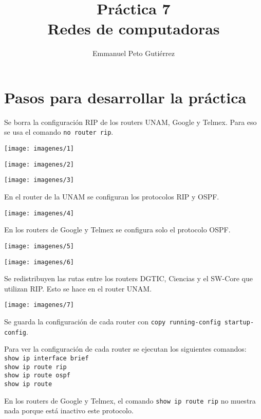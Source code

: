 \documentclass{article}
\title{Práctica 7\\Redes de computadoras}
\author{Emmanuel Peto Gutiérrez}
\begin{document}
\maketitle

\section{Pasos para desarrollar la práctica}

Se borra la configuración RIP de los routers UNAM, Google y Telmex. Para eso se usa el comando \texttt{no router rip}.

\begin{center}
\texttt{[image: imagenes/1]}

\texttt{[image: imagenes/2]}

\texttt{[image: imagenes/3]}
\end{center}

En el router de la UNAM se configuran los protocolos RIP y OSPF.

\begin{center}
\texttt{[image: imagenes/4]}
\end{center}

En los routers de Google y Telmex se configura solo el protocolo OSPF.

\begin{center}
\texttt{[image: imagenes/5]}

\texttt{[image: imagenes/6]}
\end{center}

Se redistribuyen las rutas entre los routers DGTIC, Ciencias y el SW-Core que utilizan RIP. Esto se hace en el router UNAM.

\begin{center}
\texttt{[image: imagenes/7]}
\end{center}

Se guarda la configuración de cada router con \texttt{copy running-config startup-config}.

Para ver la configuración de cada router se ejecutan los siguientes comandos:\\
\texttt{show ip interface brief}\\
\texttt{show ip route rip}\\
\texttt{show ip route ospf}\\
\texttt{show ip route}

En los routers de Google y Telmex, el comando \texttt{show ip route rip} no muestra nada porque está inactivo este protocolo.
\end{document}
